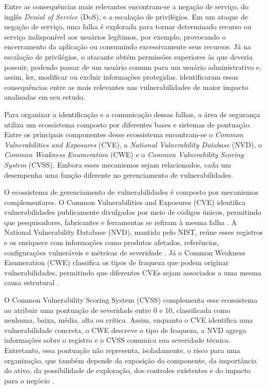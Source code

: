 Entre as consequências mais relevantes encontram-se a negação de serviço, do inglês \textit{Denial of Service} (DoS), e a escalação de privilégios. Em um ataque de negação de serviço, uma falha é explorada para tornar determinado recurso ou serviço indisponível aos usuários legítimos, por exemplo, provocando o encerramento da aplicação ou consumindo excessivamente seus recursos. Já na escalação de privilégios, o atacante obtém permissões superiores às que deveria possuir, podendo passar de um usuário comum para um usuário administrativo e, assim, ler, modificar ou excluir informações protegidas.  identificaram essas consequências entre as mais relevantes nas vulnerabilidades de maior impacto analisadas em seu estudo.

Para organizar a identificação e a comunicação dessas falhas, a área de segurança utiliza um ecossistema composto por diferentes bases e sistemas de pontuação. Entre os principais componentes desse ecossistema encontram-se o \textit{Common Vulnerabilities and Exposures} (CVE), a \textit{National Vulnerability Database} (NVD), o \textit{Common Weakness Enumeration} (CWE) e o \textit{Common Vulnerability Scoring System} (CVSS). Embora esses mecanismos sejam relacionados, cada um desempenha uma função diferente no gerenciamento de vulnerabilidades.

O ecossistema de gerenciamento de vulnerabilidades é composto por mecanismos complementares. O Common Vulnerabilities and Exposures (CVE) identifica vulnerabilidades publicamente divulgadas por meio de códigos únicos, permitindo que pesquisadores, fabricantes e ferramentas se refiram à mesma falha \cite{cve_overview}. A National Vulnerability Database (NVD), mantida pelo NIST, reúne esses registros e os enriquece com informações como produtos afetados, referências, configurações vulneráveis e métricas de severidade \cite{nvd_home}. Já o Common Weakness Enumeration (CWE) classifica os tipos de fraqueza que podem originar vulnerabilidades, permitindo que diferentes CVEs sejam associados a uma mesma causa estrutural \cite{cwe_about}.

O Common Vulnerability Scoring System (CVSS) complementa esse ecossistema ao atribuir uma pontuação de severidade entre 0 e 10, classificada como nenhuma, baixa, média, alta ou crítica. Assim, enquanto o CVE identifica uma vulnerabilidade concreta, o CWE descreve o tipo de fraqueza, a NVD agrega informações sobre o registro e o CVSS comunica sua severidade técnica. Entretanto, essa pontuação não representa, isoladamente, o risco para uma organização, que também depende da exposição do componente, da importância do ativo, da possibilidade de exploração, dos controles existentes e do impacto para o negócio \cite{first_cvss_v4}.

